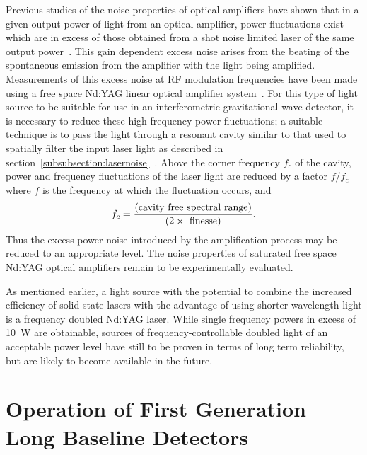 \documentclass{article}
\begin{document}
Previous studies of the noise properties of optical amplifiers have
shown that in a given output power of light from an optical amplifier,
power fluctuations exist which are in excess of those obtained from a
shot noise limited laser of the same output power~\cite{Harris}. This
gain dependent excess noise arises from the beating of the spontaneous
emission from the amplifier with the light being amplified.
Measurements of this excess noise at RF modulation frequencies have
been made using a free space Nd:YAG linear optical amplifier
system~\cite{Tulloch}. For this type of light source to be suitable
for use in an interferometric gravitational wave detector, it is
necessary to reduce these high frequency power fluctuations; a
suitable technique is to pass the light through a resonant cavity
similar to that used to spatially filter the input laser light as
described in section~\ref{subsubsection:lasernoise}~\cite{Willke}. Above
the corner frequency $f_{c}$ of the cavity, power and frequency
fluctuations of the laser light are reduced by a factor $f/ f_{c}$
where $f$ is the frequency at which the fluctuation occurs, and
%
\begin{equation}
  f_c = \frac{({\rm cavity\ free\ spectral\ range})}{(2 \times {\rm
  \ finesse})}.
  \label{equation:filtering}
\end{equation}
%
Thus the excess power noise introduced by the amplification process
may be reduced to an appropriate level. The noise properties of
saturated free space Nd:YAG optical amplifiers remain to be
experimentally evaluated.

As mentioned earlier, a light source with the potential to combine the
increased efficiency of solid state lasers with the advantage of using
shorter wavelength light is a frequency doubled Nd:YAG laser.
While single frequency powers in excess of 10~W are obtainable,
sources of frequency-controllable doubled light of
an acceptable power level have still to be proven in terms of long term
reliability, but are likely to become available in the future.


\newpage

\section{Operation of First Generation Long Baseline Detectors}
\label{section:construction}
\end{document}
